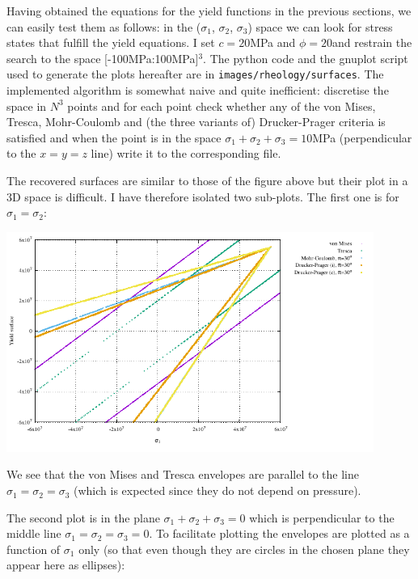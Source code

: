 Having obtained the equations for the yield functions in the previous sections, we can easily test
them as follows: in the ($\sigma_1$, $\sigma_2$, $\sigma_3$) space we can look for stress states 
that fulfill the yield equations. I set $c=20$MPa and $\phi=20$\degree and restrain 
the search to the space [-100MPa:100MPa]$^3$.
The python code and the gnuplot script used to generate the plots hereafter 
are in {\tt images/rheology/surfaces}. The implemented algorithm is somewhat  
naive and quite inefficient: discretise the space in $N^3$ points and for each point 
check whether any of the von Mises, Tresca, Mohr-Coulomb and (the three variants of) Drucker-Prager 
criteria is satisfied and when the point is in the space $\sigma_1+\sigma_2+\sigma_3=10$MPa 
(perpendicular to the $x=y=z$ line) write it to the corresponding file.

The recovered surfaces are similar to those of the figure above but their plot in a 3D space is difficult.
I have therefore isolated two sub-plots. 
The first one is for $\sigma_1=\sigma_2$:

\begin{center}
\includegraphics[width=12cm]{images/rheology/surfaces/surfaces_xy.pdf}
\end{center}
We see that the von Mises and Tresca envelopes are parallel to the line $\sigma_1=\sigma_2=\sigma_3$ (which 
is expected since they do not depend on pressure).

The second plot is in the plane $\sigma_1+\sigma_2+\sigma_3=0$ which is perpendicular to the middle line 
$\sigma_1=\sigma_2=\sigma_3=0$. To facilitate plotting the envelopes are plotted as a function of $\sigma_1$ only (so that even though they are circles in the chosen plane they appear here as ellipses):

